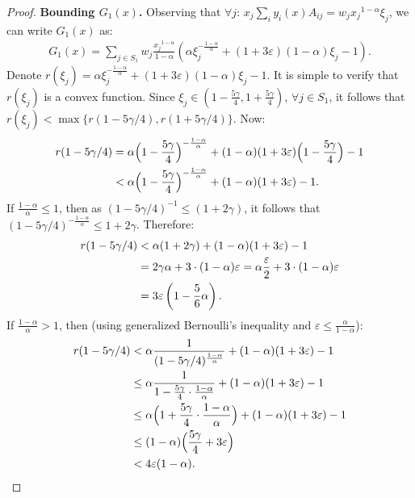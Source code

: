 \documentclass[11pt]{article}
\begin{document}
\begin{proof}
\noindent\textbf{Bounding $G_1(x)$.} Observing that $\forall j$: $x_j\sum_i y_i(x)A_{ij} = w_j {x_j}^{1-\alpha}\xi_j$, we can write $G_1(x)$ as:
\begin{align}
G_1(x) = \sum_{j\in S_1} w_j \frac{{x_j}^{1-\alpha}}{1-\alpha}\left(\alpha \xi_j^{-\frac{1-\alpha}{\alpha}} + (1+3\varepsilon)(1-\alpha)\xi_j-1\right).\label{eq:alpha<1-G-1}
\end{align}
Denote $r(\xi_j) = \alpha \xi_j^{-\frac{1-\alpha}{\alpha}} + (1+3\varepsilon)(1-\alpha)\xi_j-1$. It is simple to verify that $r(\xi_j)$ is a convex function. Since $\xi_j \in \left(1-\frac{5\gamma}{4}, 1+\frac{5\gamma}{4}\right)$, $\forall j\in S_1$, it follows that $r(\xi_j) < \max \{r(1-5\gamma/4), r(1+5\gamma/4)\}$. Now:
\begin{align}
r(1-5\gamma/4) &= \alpha \Big(1-\frac{5\gamma}{4}\Big)^{-\frac{1-\alpha}{\alpha}} + (1-\alpha)(1+3\varepsilon)\Big(1-\frac{5\gamma}{4}\Big)-1\notag\\
&< \alpha \Big(1-\frac{5\gamma}{4}\Big)^{-\frac{1-\alpha}{\alpha}} + (1-\alpha)(1+3\varepsilon) - 1.\notag
\end{align}
If $\frac{1-\alpha}{\alpha}\leq 1$, then as $(1-5\gamma/4)^{-1}\leq (1+2\gamma)$, it follows that $(1-5\gamma/4)^{-\frac{1-\alpha}{\alpha}}\leq 1+2\gamma$. Therefore:
\begin{align}
r(1-5\gamma/4)&< \alpha(1+2\gamma) + (1-\alpha)(1+3\varepsilon) - 1\notag\\
&= 2\gamma \alpha + 3\cdot(1-\alpha)\varepsilon = \alpha \frac{\varepsilon}{2} + 3\cdot(1-\alpha)\varepsilon\notag\\
&= 3\varepsilon\left(1-\frac{5}{6}\alpha\right).\label{eq:alpha<1-r-1}
\end{align}
If $\frac{1-\alpha}{\alpha}>1$, then (using generalized Bernoulli's inequality and $\varepsilon \leq \frac{\alpha}{1-\alpha}$):
\begin{align}
r(1-5\gamma/4) &< \alpha \frac{1}{(1-5\gamma/4)^{\frac{1-\alpha}{\alpha}}} + (1-\alpha)(1+3\varepsilon) - 1\notag\\
&\leq \alpha \frac{1}{1-\frac{5\gamma}{4}\cdot\frac{1-\alpha}{\alpha}} + (1-\alpha)(1+3\varepsilon) - 1\notag\\
&\leq \alpha \Big(1+\frac{5\gamma}{4}\cdot \frac{1-\alpha}{\alpha}\Big) + (1-\alpha)(1+3\varepsilon) - 1\notag\\
&\leq (1-\alpha)\Big(\frac{5\gamma}{4} + 3\varepsilon\Big)\notag\\
&< 4\varepsilon(1-\alpha).\label{eq:alpha<1-r-2}
\end{align}

\end{proof}
\end{document}
